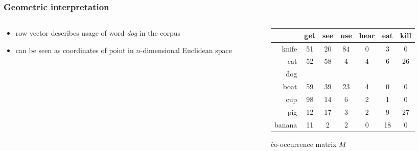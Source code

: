 \begin{frame}
  \frametitle{Geometric interpretation}

  \begin{columns}[T]
    \begin{column}{40mm}
      \begin{itemize}
      \item row vector  describes usage of word \emph{dog} in the corpus
      \item can be seen as coordinates of point in $n$-dimensional Euclidean space
       \end{itemize}
    \end{column}
    \begin{column}{75mm}      
      \gap[2]
      \begin{small}
        \setlength{\arrayrulewidth}{1pt}
        \begin{tabular}{r*{6}{|c}|}
          & get & see & use & hear & eat & kill \\
          \hline
          knife &  51 & 20 & 84 &  0 &  3 &  0 \\
          \hline
          cat  &  52 & 58 &  4 &  4 &  6 & 26 \\
          \hline
          \h{dog} &  &  &  &  &  &  \\
          \hline
          boat &  59 & 39 & 23 &  4 &  0 &  0 \\
          \hline
          cup  &  98 & 14 &  6 &  2 &  1 &  0 \\
          \hline
          pig  &  12 & 17 &  3 &  2 &  9 & 27 \\
          \hline
          banana & 11 &  2 &  2 &  0 & 18 &  0 \\
          \hline
        \end{tabular}
      \end{small}

      \begin{center}
        \h{co-occurrence matrix} $M$
      \end{center}
    \end{column}
  \end{columns}
\end{frame}

